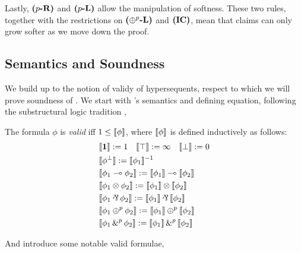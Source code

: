 Lastly, ${\normalfont \textbf{($p$-R)}}$ and ${\normalfont \textbf{($p$-L)}}$ allow the manipulation of softness. These two rules, together with the restrictions on ${\normalfont \textbf{($\oplus^{p}$-L)}}$ and ${\normalfont \textbf{(IC)}}$, mean that claims can only grow softer as we move down the proof.  



\subsection{Semantics and Soundness}
\label{section:soundness}
We build up to the notion of validy of hypersequents, respect to which we will prove soundness of \OL{}. We start with \OL{}'s semantics and defining equation, following the substructural logic tradition \citep{galatos2007residuated},

\begin{definition}
    The formula $\phi$ is \emph{valid} iff $1 \leq \llbracket \phi \rrbracket$, where $\llbracket \phi \rrbracket$ is defined inductively as follows:
    \begin{equation}
\label{semantics}
    \begin{split}
    &\m{\unit} := 1 \quad \m{\top} := \infty \quad \m{\bot} := 0\\
    &\m{\ldual{\phi}} := \edual{\m{\phi_{1}}}\\
    &\m{\phi_{1} \ediv \phi_{2}} := \m{\phi_{1}} \ediv \m{\phi_{2}}\\
    &\m{\phi_{1} \conmul \phi_{2}} := \m{\phi_{1}} \conmul \m{\phi_{2}}\\
    &\m{\phi_{1} \dismul \phi_{2}} := \m{\phi_{1}} \dismul \m{\phi_{2}}\\
    &\m{\phi_{1} \psum{p} \phi_{2}} := \m{\phi_{1}} \psum{p} \m{\phi_{2}}\\
    &\m{\phi_{1} \phsum{p} \phi_{2}} := \m{\phi_{1}} \phsum{p} \m{\phi_{2}}\\
    \end{split}
\end{equation}
\end{definition}

And introduce some notable valid formulae,


